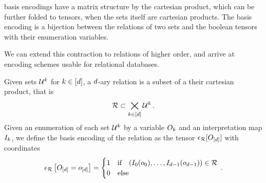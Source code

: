 basis encodings have a matrix structure by the cartesian product, which can be further folded to tensors, when the sets itself are cartesian products.
The basis encoding is a bijection between the relations of two sets and the boolean tensors with their enumeration variables.

%




We can extend this contraction to relations of higher order, and arrive at encoding schemes usable for relational databases.

\begin{definition}
    \label{def:daryRelation}
    Given sets $\mathcal{U}^{k}$ for $k\in[d]$, a $d$-ary relation is a subset of a their cartesian product, that is
    \begin{align*}
        \mathcal{R} \subset\bigtimes_{k\in[d]} \mathcal{U}^{k} \, .
    \end{align*}
    Given an enumeration of each set $\mathcal{U}^{k}$ by a variable $O_{k}$ and an interpretation map $I_{k}$, we define the basis encoding of the relation as the tensor $\epsilon_{\mathcal{R}}[O_{[d]}]$ with coordinates
    \begin{align*}
        \epsilon_{\mathcal{R}}\left[O_{[d]}=o_{[d]}\right]
        = \begin{cases}
              1 & \text{if} \quad (I_{0}(o_{0}),\ldots,I_{d-1}(o_{d-1})) \in \mathcal{R} \\
              0 & \text{else}
        \end{cases} \, .
    \end{align*}
\end{definition}

